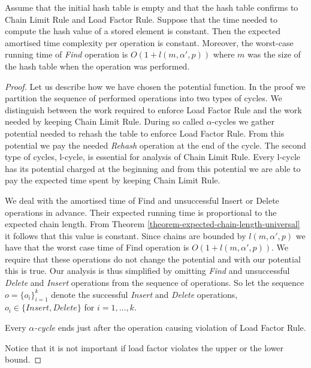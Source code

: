 \documentclass[runningheads,a4paper]{llncs}
\begin{document}
\begin{theorem}
\label{theorem-delete-time}
Assume that the initial hash table is empty and that the hash table confirms to Chain Limit Rule and Load Factor Rule. Suppose that the time needed to compute the hash value of a stored element is constant. Then the expected amortised time complexity per operation is constant. Moreover, the worst-case running time of \emph{Find} operation is $O(1 + l(m, \alpha', p))$ where $m$ was the size of the hash table when the operation was performed.
\end{theorem}
\begin{proof}
Let us describe how we have chosen the potential function. In the proof we partition the sequence of performed operations into two types of cycles. We distinguish between the work required to enforce Load Factor Rule and the work needed by keeping Chain Limit Rule. During so called $\alpha$-cycles we gather potential needed to rehash the table to enforce Load Factor Rule. From this potential we pay the needed \emph{Rehash} operation at the end of the cycle. The second type of cycles, l-cycle, is essential for analysis of Chain Limit Rule. Every l-cycle has its potential charged at the beginning and from this potential we are able to pay the expected time spent by keeping Chain Limit Rule.

We deal with the amortised time of Find and unsuccessful Insert or Delete operations in advance. Their expected running time is proportional to the expected chain length. From Theorem \ref{theorem-expected-chain-length-universal} it follows that this value is constant. Since chains are bounded by $l(m, \alpha', p)$ we have that the worst case time of Find operation is $O(1 + l(m, \alpha', p))$. We require that these operations do not change the potential and with our potential this is true. Our analysis is thus simplified by omitting \emph{Find} and unsuccessful \emph{Delete} and \emph{Insert} operations from the sequence of operations. So let the sequence $o = \{o_i\}_{i=1}^{k}$ denote the successful \emph{Insert} and \emph{Delete} operations, $o_i \in \{Insert, Delete\}$ for $i = 1, \dots, k$.

\begin{definition}
Every \emph{$\alpha$-cycle} ends just after the operation causing violation of Load Factor Rule.
\end{definition}
Notice that it is not important if load factor violates the upper or the lower bound.


\end{proof}
\end{document}
